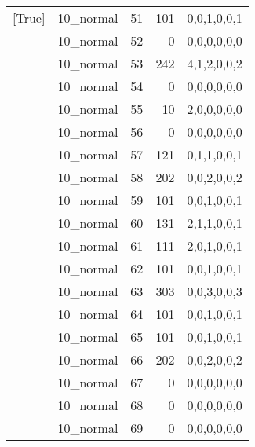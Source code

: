\begin{tabular}{llrrl}
 [True]          & 10\_normal           &            51 &                   101 & 0,0,1,0,0,1   \\
 [True]          & 10\_normal           &            52 &                     0 & 0,0,0,0,0,0   \\
 [True]          & 10\_normal           &            53 &                   242 & 4,1,2,0,0,2   \\
 [True]          & 10\_normal           &            54 &                     0 & 0,0,0,0,0,0   \\
 [True]          & 10\_normal           &            55 &                    10 & 2,0,0,0,0,0   \\
 [True]          & 10\_normal           &            56 &                     0 & 0,0,0,0,0,0   \\
 [True]          & 10\_normal           &            57 &                   121 & 0,1,1,0,0,1   \\
 [True]          & 10\_normal           &            58 &                   202 & 0,0,2,0,0,2   \\
 [True]          & 10\_normal           &            59 &                   101 & 0,0,1,0,0,1   \\
 [True]          & 10\_normal           &            60 &                   131 & 2,1,1,0,0,1   \\
 [True]          & 10\_normal           &            61 &                   111 & 2,0,1,0,0,1   \\
 [True]          & 10\_normal           &            62 &                   101 & 0,0,1,0,0,1   \\
 [True]          & 10\_normal           &            63 &                   303 & 0,0,3,0,0,3   \\
 [True]          & 10\_normal           &            64 &                   101 & 0,0,1,0,0,1   \\
 [True]          & 10\_normal           &            65 &                   101 & 0,0,1,0,0,1   \\
 [True]          & 10\_normal           &            66 &                   202 & 0,0,2,0,0,2   \\
 [True]          & 10\_normal           &            67 &                     0 & 0,0,0,0,0,0   \\
 [True]          & 10\_normal           &            68 &                     0 & 0,0,0,0,0,0   \\
 [True]          & 10\_normal           &            69 &                     0 & 0,0,0,0,0,0   \\

\end{tabular}
